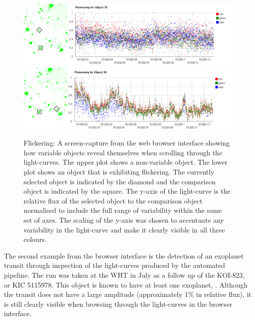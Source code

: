 \begin{figure}
\centering
\includegraphics[width=150mm]{images/gumus-comparison-lc.png}
\includegraphics[width=150mm]{images/gumus-discovery-lc.png}
\caption{Flickering: A screen-capture from the web browser interface showing how variable objects reveal themselves when scrolling through the light-curves. The upper plot shows a non-variable object. The lower plot shows an object that is exhibiting flickering.  The currently selected object is indicated by the diamond and the comparison object is indicated by the square. The y-axis of the light-curve is the relative flux of the selected object to the comparison object normalised to include the full range of variability within the same set of axes. The scaling of the y-axis was chosen to accentuate any variability in the light-curve and make it clearly visible in all three colours.}
\label{fig:gumus-discovery}
\end{figure}

The second example from the browser interface is the detection of an exoplanet transit through inspection of the light-curves produced by the automated pipeline. The run was taken at the WHT in July as a follow up of the KOI-823, or KIC 5115978. This object is known to have at least one exoplanet, \citep{KIC5115978}. Although the transit does not have a large amplitude (approximately 1\% in relative flux), it is still clearly visible when browsing through the light-curves in the browser interface. 

